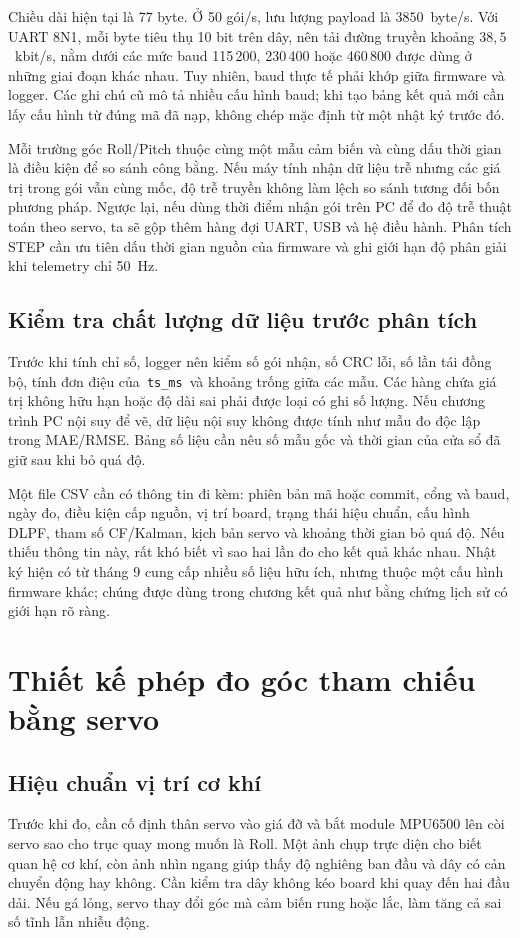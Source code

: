 Chiều dài hiện tại là 77 byte. Ở 50 gói/s, lưu lượng payload là $3850$~byte/s. Với UART 8N1, mỗi byte tiêu thụ 10 bit trên dây, nên tải đường truyền khoảng $38{,}5$~kbit/s, nằm dưới các mức baud 115\,200, 230\,400 hoặc 460\,800 được dùng ở những giai đoạn khác nhau. Tuy nhiên, baud thực tế phải khớp giữa firmware và logger. Các ghi chú cũ mô tả nhiều cấu hình baud; khi tạo bảng kết quả mới cần lấy cấu hình từ đúng mã đã nạp, không chép mặc định từ một nhật ký trước đó.

Mỗi trường góc Roll/Pitch thuộc cùng một mẫu cảm biến và cùng dấu thời gian là điều kiện để so sánh công bằng. Nếu máy tính nhận dữ liệu trễ nhưng các giá trị trong gói vẫn cùng mốc, độ trễ truyền không làm lệch so sánh tương đối bốn phương pháp. Ngược lại, nếu dùng thời điểm nhận gói trên PC để đo độ trễ thuật toán theo servo, ta sẽ gộp thêm hàng đợi UART, USB và hệ điều hành. Phân tích STEP cần ưu tiên dấu thời gian nguồn của firmware và ghi giới hạn độ phân giải khi telemetry chỉ 50~Hz.

\subsection{Kiểm tra chất lượng dữ liệu trước phân tích}
Trước khi tính chỉ số, logger nên kiểm số gói nhận, số CRC lỗi, số lần tái đồng bộ, tính đơn điệu của \,\texttt{ts\_ms}\, và khoảng trống giữa các mẫu. Các hàng chứa giá trị không hữu hạn hoặc độ dài sai phải được loại có ghi số lượng. Nếu chương trình PC nội suy để vẽ, dữ liệu nội suy không được tính như mẫu đo độc lập trong MAE/RMSE. Bảng số liệu cần nêu số mẫu gốc và thời gian của cửa sổ đã giữ sau khi bỏ quá độ.

Một file CSV cần có thông tin đi kèm: phiên bản mã hoặc commit, cổng và baud, ngày đo, điều kiện cấp nguồn, vị trí board, trạng thái hiệu chuẩn, cấu hình DLPF, tham số CF/Kalman, kịch bản servo và khoảng thời gian bỏ quá độ. Nếu thiếu thông tin này, rất khó biết vì sao hai lần đo cho kết quả khác nhau. Nhật ký hiện có từ tháng 9 cung cấp nhiều số liệu hữu ích, nhưng thuộc một cấu hình firmware khác; chúng được dùng trong chương kết quả như bằng chứng lịch sử có giới hạn rõ ràng.

\section{Thiết kế phép đo góc tham chiếu bằng servo}
\subsection{Hiệu chuẩn vị trí cơ khí}
Trước khi đo, cần cố định thân servo vào giá đỡ và bắt module MPU6500 lên còi servo sao cho trục quay mong muốn là Roll. Một ảnh chụp trực diện cho biết quan hệ cơ khí, còn ảnh nhìn ngang giúp thấy độ nghiêng ban đầu và dây có cản chuyển động hay không. Cần kiểm tra dây không kéo board khi quay đến hai đầu dải. Nếu gá lỏng, servo thay đổi góc mà cảm biến rung hoặc lắc, làm tăng cả sai số tĩnh lẫn nhiễu động.

